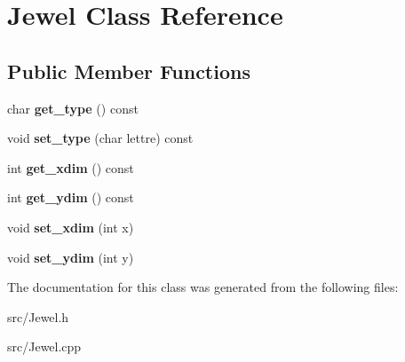 \hypertarget{classJewel}{}\section{Jewel Class Reference}
\label{classJewel}
\subsection*{Public Member Functions}
\begin{DoxyCompactItemize}
\item 
char {\bfseries get\+\_\+type} () const \hypertarget{classJewel_a3d1b09f84ad4c7ceff37d80ed169661a}{}\label{classJewel_a3d1b09f84ad4c7ceff37d80ed169661a}

\item 
void {\bfseries set\+\_\+type} (char lettre) const \hypertarget{classJewel_a79bf312c6fa21ec680eb17f83a1b8a47}{}\label{classJewel_a79bf312c6fa21ec680eb17f83a1b8a47}

\item 
int {\bfseries get\+\_\+xdim} () const \hypertarget{classJewel_a023f697e2e4d4f04ddfe36dabdb44ced}{}\label{classJewel_a023f697e2e4d4f04ddfe36dabdb44ced}

\item 
int {\bfseries get\+\_\+ydim} () const \hypertarget{classJewel_a48167d37f4af709167007e7987b7f889}{}\label{classJewel_a48167d37f4af709167007e7987b7f889}

\item 
void {\bfseries set\+\_\+xdim} (int x)\hypertarget{classJewel_a2910a83ae628913f5138945a7ebff333}{}\label{classJewel_a2910a83ae628913f5138945a7ebff333}

\item 
void {\bfseries set\+\_\+ydim} (int y)\hypertarget{classJewel_a64b57d2cb0fcb99fa1e1a6aec0f7047c}{}\label{classJewel_a64b57d2cb0fcb99fa1e1a6aec0f7047c}

\end{DoxyCompactItemize}


The documentation for this class was generated from the following files\+:\begin{DoxyCompactItemize}
\item 
src/Jewel.\+h\item 
src/Jewel.\+cpp\end{DoxyCompactItemize}
